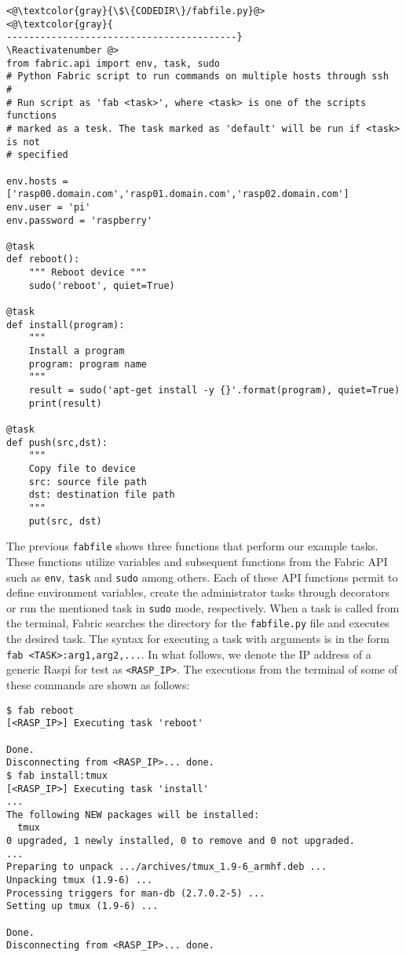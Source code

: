 \Suppressnumber\begin{lstlisting}[]
<@\textcolor{gray}{\$\{CODEDIR\}/fabfile.py}@>
<@\textcolor{gray}{
-----------------------------------------}
\Reactivatenumber @>
from fabric.api import env, task, sudo
# Python Fabric script to run commands on multiple hosts through ssh
#
# Run script as 'fab <task>', where <task> is one of the scripts functions
# marked as a tesk. The task marked as 'default' will be run if <task> is not
# specified

env.hosts = ['rasp00.domain.com','rasp01.domain.com','rasp02.domain.com']
env.user = 'pi'
env.password = 'raspberry'

@task
def reboot():
    """ Reboot device """
    sudo('reboot', quiet=True)

@task
def install(program):
    """
    Install a program
    program: program name
    """
    result = sudo('apt-get install -y {}'.format(program), quiet=True)
    print(result)

@task
def push(src,dst):
    """
    Copy file to device
    src: source file path
    dst: destination file path
    """
    put(src, dst)

\end{lstlisting}
\FloatBarrier

The previous \texttt{fabfile} shows three functions that perform our
example tasks. These functions utilize variables and subsequent functions
from the Fabric \ac{API} such as \texttt{env}, \texttt{task} and \texttt{sudo}
among others. Each of these \ac{API} functions permit to define environment
variables, create the administrator tasks through decorators or run the
mentioned task in \texttt{sudo} mode, respectively.
When a task is called from the terminal, Fabric searches the directory for
the \texttt{fabfile.py} file and executes the desired task. The syntax for
executing a task with arguments is in the form
\texttt{fab <TASK>:arg1,arg2,...}. In what follows, we denote the
\ac{IP} address of a generic \ac{Raspi} for test as \texttt{<RASP\_IP>}.
The executions from the terminal of some of these commands are shown as
follows:

\begin{lstlisting}[]
$ fab reboot
[<RASP_IP>] Executing task 'reboot'

Done.
Disconnecting from <RASP_IP>... done.
$ fab install:tmux
[<RASP_IP>] Executing task 'install'
...
The following NEW packages will be installed:
  tmux
0 upgraded, 1 newly installed, 0 to remove and 0 not upgraded.
...
Preparing to unpack .../archives/tmux_1.9-6_armhf.deb ...
Unpacking tmux (1.9-6) ...
Processing triggers for man-db (2.7.0.2-5) ...
Setting up tmux (1.9-6) ...

Done.
Disconnecting from <RASP_IP>... done.
\end{lstlisting}
\FloatBarrier
\vspace{-5mm}

